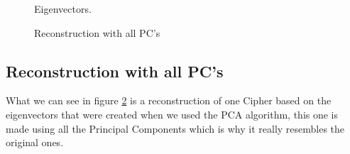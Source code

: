 \documentclass[paper=a4, fontsize=11pt]{scrartcl} %
\begin{document}
\begin{figure}[h]
{        \label{fig:pre}
	}
    \caption{Eigenvectors.}
    \label{fig:hist}
\end{figure}
\clearpage
\begin{figure}[h]
    \centering
    \caption{Reconstruction with all PC's}
    \label{fig:reconFull}
\end{figure}

\subsection{Reconstruction with all PC's}
What we can see in figure \ref{fig:reconFull} is a reconstruction of one Cipher based on the eigenvectors that were created when we used the PCA algorithm, this one is made using all the Principal Components which is why it really resembles the original ones.
\end{document}
